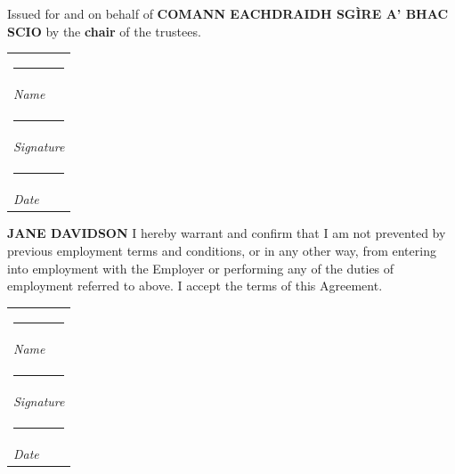 \documentclass[a4paper,11pt,onecolumn ]{article}
\makeatletter
\newcommand{\namesigdate}[2][5cm]{%
  \begin{tabular}{@{}p{#1}@{}}
    #2 \\[2\normalbaselineskip] \hrule \\[0pt]
    {\small \textit{Name}} \\[2\normalbaselineskip] \hrule \\[0pt]
    {\small \textit{Signature}} \\[2\normalbaselineskip] \hrule \\[0pt]
    {\small \textit{Date}}
  \end{tabular}
}
\makeatother
\begin{document}
\begin{center}
    
\begin{multicols}{2}
\begin{center}
Issued for and on behalf of \textbf{COMANN EACHDRAIDH SGÌRE A' BHAC SCIO} by the
\textbf{chair} of the trustees.
\end{center}


\noindent
\namesigdate{}

\columnbreak

\begin{center}
\textbf{JANE DAVIDSON}
I hereby warrant and confirm that I am not prevented by previous employment terms
and conditions, or in any other way, from entering into employment with the Employer
or performing any of the duties of employment referred to above. I accept the terms of
this Agreement.
\end{center}

\noindent
\namesigdate{}


\end{multicols}

\end{center}
\end{document}
